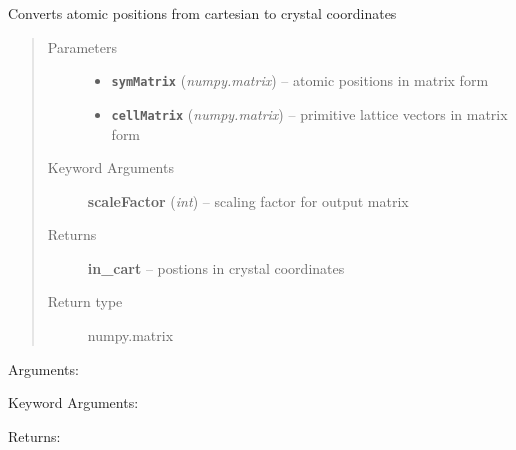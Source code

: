 \documentclass[letterpaper,10pt,english]{sphinxmanual}
\begin{document}

\begin{fulllineitems}
\label{retr:retr.__convertFractional}
Converts atomic positions from cartesian to crystal coordinates
\begin{quote}\begin{description}
\item[{Parameters}] \leavevmode\begin{itemize}
\item {} 
\textbf{\texttt{symMatrix}} (\emph{numpy.matrix}) -- atomic positions in matrix form

\item {} 
\textbf{\texttt{cellMatrix}} (\emph{numpy.matrix}) -- primitive lattice vectors in matrix form

\end{itemize}

\item[{Keyword Arguments}] \leavevmode
\textbf{scaleFactor} (\emph{int}) --
scaling factor for output matrix

\item[{Returns}] \leavevmode
\textbf{in\_cart} --
postions in crystal coordinates

\item[{Return type}] \leavevmode
numpy.matrix

\end{description}\end{quote}

\end{fulllineitems}


\begin{fulllineitems}
\label{retr:retr.__duplicateEdgeAtoms}
Arguments:

Keyword Arguments:

Returns:

\end{fulllineitems}

\end{document}
